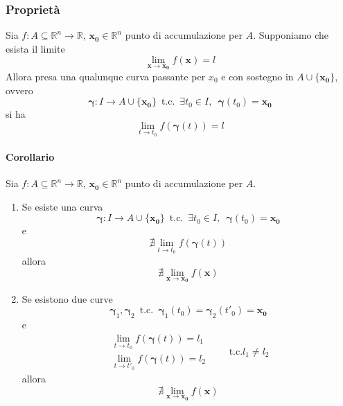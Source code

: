 \documentclass[x11names]{article}
\begin{document}
	\begin{center}
		\colorbox{myred}{\begin{minipage}{5.75in}
				\begin{redes}{}
					\subsubsection{Proprietà}
					Sia \(f:A\subseteq \mathbb{R}^n \to \mathbb{R}\), \(\boldsymbol{x_{0}} \in \mathbb{R}^n\) punto di accumulazione per \(A\). Supponiamo che esista il limite
					\[ 
					\lim_{\boldsymbol{x}\to\boldsymbol{x_0}}f(\boldsymbol{x}) = l
					\]
					Allora presa una qualunque curva passante per \(x_{0}\) e con sostegno in \(A \cup \{\boldsymbol{x_{0}}\}\), ovvero 
					\[
					\boldsymbol{\gamma}: I \to A\cup\{\boldsymbol{x_{0}}\} \;\ \text{t.c.} \;\ \exists  t_{0} \in I, \;\ \boldsymbol{\gamma}(t_{0}) = \boldsymbol{x_{0}}
					\]
					si ha
					\[ 
					\lim_{t\to t_0}f(\boldsymbol{\gamma}(t)) = l
					\]
				\end{redes}
		\end{minipage}}
	\end{center}
	
	\paragraph{Corollario} Sia \(f:A\subseteq \mathbb{R}^n \to \mathbb{R}\), \(\boldsymbol{x_{0}} \in \mathbb{R}^n\) punto di accumulazione per \(A\).
	\begin{enumerate}
		\item Se esiste una curva
		\[ 
		\boldsymbol{\gamma}: I \to A\cup\{\boldsymbol{x_{0}}\} \;\ \text{t.c.} \;\ \exists  t_{0} \in I, \;\ \boldsymbol{\gamma}(t_{0}) = \boldsymbol{x_{0}}
		\]
		e 
		\[ 
		\nexists \lim_{t\to t_0}f(\boldsymbol{\gamma}(t))
		\]
		allora
		\[ 
		\nexists \lim_{\boldsymbol{x}\to \boldsymbol{x_{0}}}f(\boldsymbol{\boldsymbol{x}})
		\]
		\item Se esistono due curve
		\[ 
		\boldsymbol{\gamma}_{1}, \boldsymbol{\gamma}_{2} \;\ \text{t.c.} \;\ \boldsymbol{\gamma}_{1}(t_{0}) = \boldsymbol{\gamma}_{2}(t'_{0}) = \boldsymbol{x_{0}}
		\]
		e
		\[ 
		\begin{array}{c}
			\lim_{t\to t_0}f(\boldsymbol{\gamma}(t)) = l_{1} \\
			\lim_{t\to t'_0}f(\boldsymbol{\gamma}(t)) = l_{2}
		\end{array} \qquad \text{t.c.} l_{1} \neq l_{2}
		\]
		allora
		\[ 
		\nexists \lim_{\boldsymbol{x}\to \boldsymbol{x_{0}}}f(\boldsymbol{\boldsymbol{x}})
		\]
	\end{enumerate}
	
\end{document}

